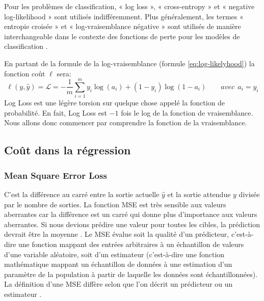 		
		
		
	
		Pour les problèmes de classification, « log loss », « cross-entropy » et « negative log-likelihood » sont utilisés indifféremment. Plus généralement, les termes « entropie croisée » et « log-vraisemblance négative » sont utilisés de manière interchangeable dans le contexte des fonctions de perte pour les modèles de classification \cite{bishop2006pattern, goodfellow2016deep}.
		
		En partant de la formule de la log-vraisemblance (formule \ref{eq:log-likelyhood}) la fonction coût $\ell$ sera:
		\begin{equation}\label{eq:log-loss}
			\ell(y,\hat{y}) = \mathcal{L} = -\frac{1}{m}\sum_{i=1}^{m} {y_i}\log( {a_i}) +{(1-y_i)}\log(1-a_i) 
			\qquad avec \ \ a_i = \hat{y_i}
		\end{equation}
		Log Loss est une légère torsion sur quelque chose appelé la fonction de probabilité. En fait, Log Loss est $ -1 $ fois le log de la fonction de vraisemblance. Nous allons donc commencer par comprendre la fonction de la  vraisemblance.
		
	
		
	
	\subsection{Coût dans la régression}
		\subsubsection{Mean Square Error Loss}
		
		 C'est la différence au carré entre la sortie actuelle $\hat{y}$ et la sortie attendue $y$ divisée par le nombre de sorties. La fonction MSE est très sensible aux valeurs aberrantes car la différence est un carré qui donne plus d'importance aux valeurs aberrantes. Si nous devions prédire une valeur pour toutes les cibles, la prédiction devrait être la moyenne \cite{bishop2006pattern, goodfellow2016deep}.
		 Le MSE évalue soit la qualité d'un prédicteur, c'est-à-dire une fonction mappant des entrées arbitraires à un échantillon de valeurs d'une variable aléatoire, soit d'un estimateur (c'est-à-dire une fonction mathématique mappant un échantillon de données à une estimation d'un paramètre de la population à partir de laquelle les données sont échantillonnées). La définition d'une MSE diffère selon que l'on décrit un prédicteur ou un estimateur \cite{sarkar2017practical, burges2006learning}.
		 
